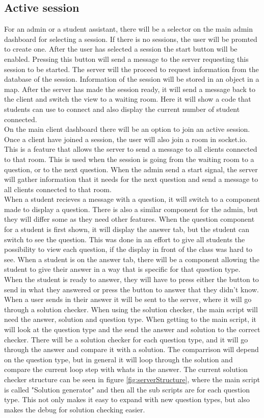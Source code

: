 \subsection{Active session}
For an admin or a student assistant, there will be a selector on the main admin dashboard for selecting a session. If there is no sessions, the user will be promted to create one. After the user has selected a session the start button will be enabled. Pressing this button will send a message to the server requesting this session to be started. The server will the proceed to request information from the database of the session. Information of the session will be stored in an object in a map. After the server has made the session ready, it will send a message back to the client and switch the view to a waiting room. Here it will show a code that students can use to connect and also display the current number of student connected. 
\\[11pt]
On the main client dashboard there will be an option to join an active session. Once a client have joined a session, the user will also join a room in socket.io. This is a feature that allows the server to send a message to all clients connected to that room. This is used when the session is going from the waiting room to a question, or to the next question. When the admin send a start signal, the server will gather information that it needs for the next question and send a message to all clients connected to that room.
\\[11pt]
When a student recieves a message with a question, it will switch to a component made to display a question. There is also a similar component for the admin, but they will differ some as they need other features. When the question component for a student is first shown, it will display the answer tab, but the student can switch to see the question. This was done in an effort to give all students the possibility to view each question, if the display in front of the class was hard to see. When a student is on the answer tab, there will be a component allowing the student to give their answer in a way that is specific for that question type. When the student is ready to answer, they will have to press either the button to send in what they answered or press the button to answer that they didn't know.
\\[11pt]
When a user sends in their answer it will be sent to the server, where it will go through a solution checker. When using the solution checker, the main script will need the answer, solution and question type. When getting to the main script, it will look at the question type and the send the answer and solution to the correct checker. There will be a solution checker for each question type, and it will go through the answer and compare it with a solution. The comparrison will depend on the question type, but in general it will loop through the solution and compare the current loop step with whats in the answer. The current solution checker structure can be seen in figure \ref{fig:serverStructure}, where the main script is called "Solution generator" and then all the sub scripts are for each question type. This not only makes it easy to expand with new question types, but also makes the debug for solution checking easier.
